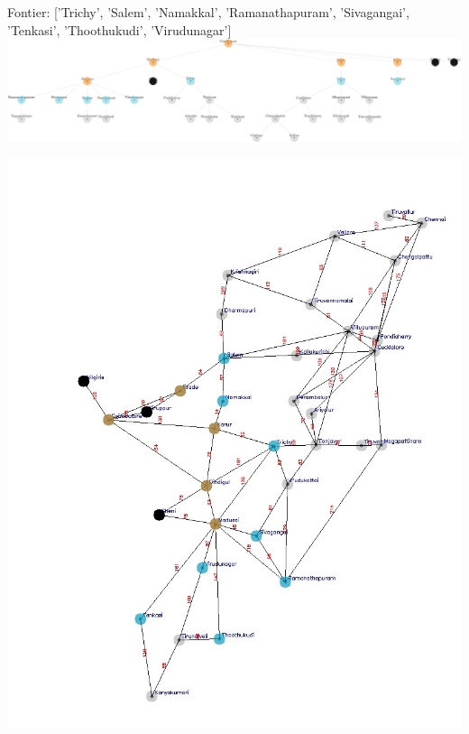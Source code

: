 \documentclass[xcolor=table]{beamer}
\begin{document}
\begin{frame}
  { \tiny Fontier: ['Trichy', 'Salem', 'Namakkal', 'Ramanathapuram', 'Sivagangai', 'Tenkasi', 'Thoothukudi', 'Virudunagar'] }
  \includegraphics[width=1\textwidth]{../BFSNodes/13-1.png}
  \begin{center}
    \includegraphics[height=0.6\textheight]{../BFSoutput/tamilBFS11.jpg}
  \end{center}
\end{frame}
\end{document}
